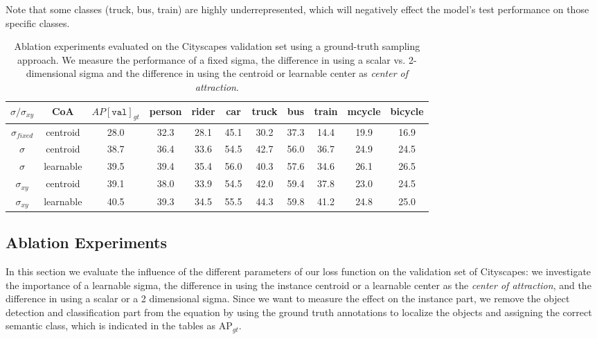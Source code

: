 Note that some classes (truck, bus, train) are highly underrepresented, which will negatively effect the model's test performance on those specific classes.

\begin{table*}
    \small
    \centering
    \begin{tabular}{c|c|c|c c c c c c c c}
        $\sigma / \sigma_{xy}$  & CoA & $AP[\texttt{val}]_{gt}$ & person & rider & car & truck & bus & train & mcycle & bicycle \\
        \hline
        $\sigma_{fixed}$         & centroid    & 28.0 & 32.3 & 28.1 & 45.1 & 30.2 & 37.3 & 14.4 & 19.9 & 16.9 \\
        $\sigma$                  & centroid    & 38.7 & 36.4 & 33.6 & 54.5 & 42.7 & 56.0 & 36.7 & 24.9 & 24.5 \\
        $\sigma$                  & learnable   & 39.5 & 39.4 & 35.4 & 56.0 & 40.3 & 57.6 & 34.6 & 26.1 & 26.5 \\
        $\sigma_{xy}$           & centroid    & 39.1 & 38.0 & 33.9 & 54.5 & 42.0 & 59.4 & 37.8 & 23.0 & 24.5 \\
        $\sigma_{xy}$           & learnable   & 40.5 & 39.3 & 34.5 & 55.5 & 44.3 & 59.8 & 41.2 & 24.8 & 25.0 \\
    \end{tabular}
    \vspace{3mm}
    \caption{Ablation experiments evaluated on the Cityscapes validation set using a ground-truth sampling approach. We measure the performance of a fixed sigma, the difference in using a scalar vs. 2-dimensional sigma and the difference in using the centroid or learnable center as \textit{center of attraction}.}
    \label{tab:abl_exp_gt}
\end{table*}

\subsection{Ablation Experiments}

In this section we evaluate the influence of the different parameters of our loss function on the validation set of Cityscapes: we investigate the importance of a learnable sigma, the difference in using the instance centroid or a learnable center as the \textit{center of attraction}, and the difference in using a scalar or a 2 dimensional sigma. Since we want to measure the effect on the instance part, we remove the object detection and classification part from the equation by using the ground truth annotations to localize the objects and assigning the correct semantic class, which is indicated in the tables as $\text{AP}_{gt}$.

